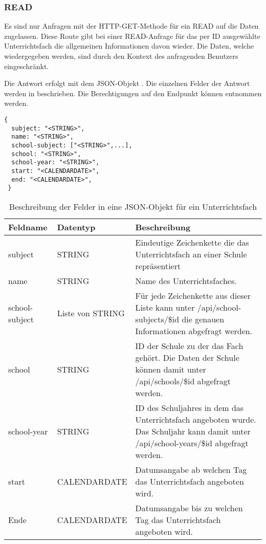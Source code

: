 \subsubsection{READ}
\label{sec:rest:api:subjects:id:read}
Es sind nur Anfragen mit der HTTP-GET-Methode für ein READ auf die Daten zugelassen.
Diese Route gibt bei einer READ-Anfrage für das per ID ausgewählte Unterrichtsfach die allgemeinen Informationen davon wieder.
Die Daten, welche wiedergegeben werden, sind durch den Kontext des anfragenden Benutzers eingeschränkt.

Die Antwort erfolgt mit dem JSON-Objekt . 
Die einzelnen Felder der Antwort werden in  beschrieben.
Die Berechtigungen auf den Endpunkt können  entnommen werden.


\begin{lstlisting}[caption={JSON-Antwort für einen GET-Aufruf der Route /api/subjects/\$id},label={lst:code:rest:api:subjects:id:read:ret},frame=tlrb]
 {
  subject: "<STRING>",
  name: "<STRING>",
  school-subject: ["<STRING>",...], 
  school: "<STRING>",
  school-year: "<STRING>",
  start: "<CALENDARDATE>",
  end: "<CALENDARDATE>",
 }
\end{lstlisting}

\begin{longtable}{|p{}|p{}|p{}|}
		\caption{Beschreibung der Felder in eine JSON-Objekt für ein Unterrichtsfach}
\endfoot
		\caption{Beschreibung der Felder in eine JSON-Objekt für ein Unterrichtsfach}
		\label{tab:rest:api:subjects:id:read:ret}
\endlastfoot 
\hline
			\textbf{Feldname} & \textbf{Datentyp} & \textbf{Beschreibung} \\ \hline
\endhead
subject & STRING & Eindeutige Zeichenkette die das Unterrichtsfach an einer Schule repräsentiert  \\ \hline
name & STRING & Name des Unterrichtsfaches. \\ \hline
school-subject & Liste von STRING & Für jede Zeichenkette aus dieser Liste kann unter /api/school-subjects/\$id die genauen Informationen abgefragt werden. \\ \hline
school & STRING & ID der Schule zu der das Fach gehört. Die Daten der Schule können damit unter /api/schools/\$id abgefragt werden. \\ \hline
school-year & STRING & ID des Schuljahres in dem das Unterrichtsfach angeboten wurde. Das Schuljahr kann damit unter /api/school-years/\$id abgefragt werden. \\ \hline
start & CALENDARDATE & Datumsangabe ab welchen Tag das Unterrichtsfach angeboten wird.  \\ \hline
Ende & CALENDARDATE & Datumsangabe bis zu welchen Tag das Unterrichtsfach angeboten wird. \\ \hline
\end{longtable}